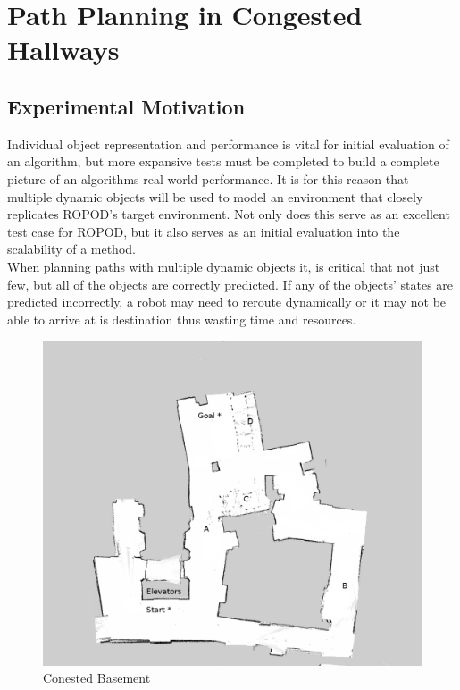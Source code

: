   \clearpage
  \section{ Path Planning in Congested Hallways}

  \subsection{ Experimental Motivation }

  Individual object representation and performance is vital for initial
  evaluation of an algorithm, but more expansive tests must be completed to
  build a complete picture of an algorithms real-world performance. It is for
  this reason that multiple dynamic objects will be used to model an environment
  that closely replicates ROPOD's target environment. Not only does this
  serve as an excellent test case for ROPOD, but it also serves as an initial
  evaluation into the scalability of a method. \\

  When planning paths with multiple dynamic objects it, is critical that not just
  few, but all of the objects are correctly predicted. If any of the objects' states are
  predicted incorrectly, a robot may need to reroute dynamically or it may not
  be able to arrive at is destination thus wasting time and resources. \\


  \begin{figure}[!htb]
    \centering
    \includegraphics[width=\linewidth]{images/basement_congestion.png}
    \caption{Conested Basement}
    \label{figure:basement_congestion}
  \end{figure}

